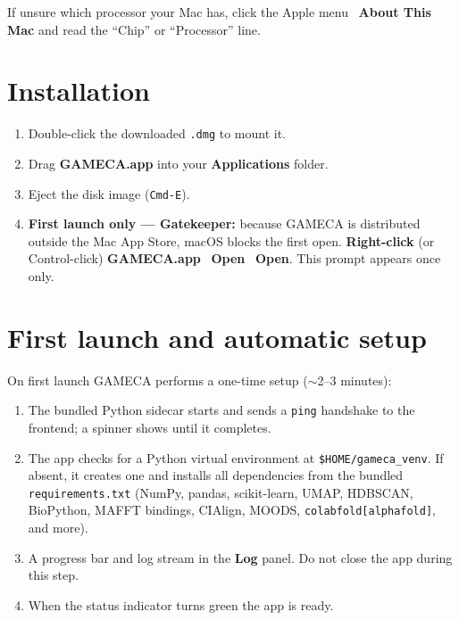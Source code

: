 \documentclass[11pt]{article}
\begin{document}
\smallskip
If unsure which processor your Mac has, click the Apple menu
\textrightarrow\ \textbf{About This Mac} and read the ``Chip'' or
``Processor'' line.

\section{Installation}

\begin{enumerate}
  \item Double-click the downloaded \texttt{.dmg} to mount it.
  \item Drag \textbf{GAMECA.app} into your \textbf{Applications} folder.
  \item Eject the disk image (\texttt{Cmd-E}).
  \item \textbf{First launch only --- Gatekeeper:} because GAMECA is
        distributed outside the Mac App Store, macOS blocks the first
        open. \textbf{Right-click} (or Control-click) \textbf{GAMECA.app}
        \textrightarrow\ \textbf{Open} \textrightarrow\ \textbf{Open}.
        This prompt appears once only.
\end{enumerate}

\section{First launch and automatic setup}

On first launch GAMECA performs a one-time setup ($\sim$2--3 minutes):

\begin{enumerate}
  \item The bundled Python sidecar starts and sends a \texttt{ping}
        handshake to the frontend; a spinner shows until it completes.
  \item The app checks for a Python virtual environment at
        \texttt{\$HOME/gameca\_venv}. If absent, it creates one and
        installs all dependencies from the bundled \texttt{requirements.txt}
        (NumPy, pandas, scikit-learn, UMAP, HDBSCAN, BioPython, MAFFT
        bindings, CIAlign, MOODS, \texttt{colabfold[alphafold]}, and more).
  \item A progress bar and log stream in the \textbf{Log} panel. Do not
        close the app during this step.
  \item When the status indicator turns green the app is ready.
\end{enumerate}
\end{document}
